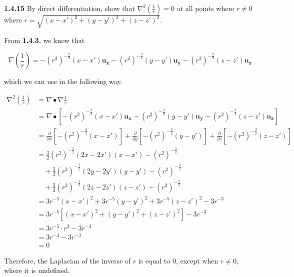 \documentclass{article}
\begin{document}
\textbf{1.4.15} By direct differentiation, show that $\nabla^2 (\frac{1}{r}) = 0$ at all points where $r \neq 0$ where
$r = \sqrt{{(x-x')}^2 + {(y-y')}^2 + {(z-z')}^2}$.

\vspace{24pt}

From \textbf{1.4.3}, we know that

\begin{equation*}
	\nabla \left(\frac{1}{r}\right) = -{(r^2)}^{-\frac{3}{2}}(x - x')\mathbf{u_x} - {(r^2)}^{-\frac{3}{2}}(y - y')\mathbf{u_y} - {(r^2)}^{-\frac{3}{2}}(z - z')\mathbf{u_z}
\end{equation*}

which we can use in the following way.

\begin{equation*}
	\begin{split}
		\nabla^2 \left(\frac{1}{r}\right) & = \nabla \bullet \nabla \frac{1}{r} \\
		& = \nabla \bullet \left[
		-{(r^2)}^{-\frac{3}{2}}(x - x')\mathbf{u_x} - {(r^2)}^{-\frac{3}{2}}(y - y')\mathbf{u_y} - {(r^2)}^{-\frac{3}{2}}(z - z')\mathbf{u_z}
		\right] \\
		& = \frac{\partial}{\partial x}\left[-{(r^2)}^{-\frac{3}{2}}(x - x')\right]
		+ \frac{\partial}{\partial y}\left[-{(r^2)}^{-\frac{3}{2}}(y - y')\right]
		+ \frac{\partial}{\partial z}\left[-{(r^2)}^{-\frac{3}{2}}(z - z')\right] \\
		& = \frac{3}{2}{(r^2)}^{-\frac{5}{2}}(2x - 2x')(x - x') - {(r^2)}^{-\frac{3}{2}} \\
		& \quad + \frac{3}{2}{(r^2)}^{-\frac{5}{2}}(2y - 2y')(y - y') - {(r^2)}^{-\frac{3}{2}} \\
		& \quad + \frac{3}{2}{(r^2)}^{-\frac{5}{2}}(2z - 2z')(z - z') - {(r^2)}^{-\frac{3}{2}} \\
		& = 3r^{-5}{(x - x')}^2 + 3r^{-5}{(y - y')}^2 + 3r^{-5}{(z - z')}^2 - 3r^{-3} \\
		& = 3r^{-5}\left[{(x - x')}^2 + {(y - y')}^2 + {(z - z')}^2\right] - 3r^{-3} \\
		& = 3r^{-5} \cdot r^2 - 3r^{-3} \\
		& = 3r^{-3} - 3r^{-3} \\
		& = 0
	\end{split}
\end{equation*}

Therefore, the Laplacian of the inverse of $r$ is equal to $0$, except when $r \neq 0$, where it is undefined.
\end{document}

